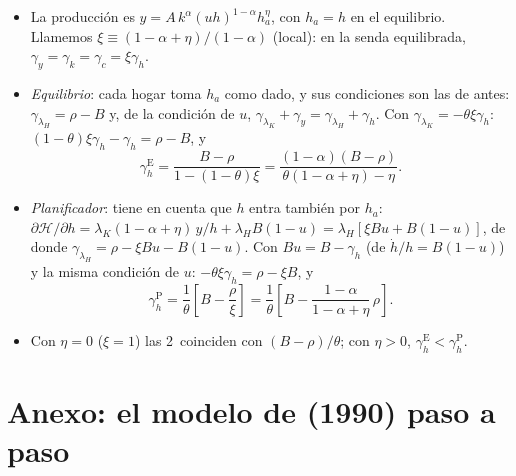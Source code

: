 \documentclass[11pt]{article}
\begin{document}
\begin{itemize}
\item La producción es $y=A\,k^{\alpha}(uh)^{1-\alpha}h_a^{\eta}$, con $h_a=h$ en el equilibrio. Llamemos $\xi\equiv(1-\alpha+\eta)/(1-\alpha)$ (local): en la senda equilibrada, $\gamma_y=\gamma_k=\gamma_c=\xi\gamma_h$.
\item \emph{Equilibrio}: cada hogar toma $h_a$ como dado, y sus condiciones son las de antes: $\gamma_{\lambda_H}=\rho-B$ y, de la condición de $u$, $\gamma_{\lambda_K}+\gamma_y=\gamma_{\lambda_H}+\gamma_h$. Con $\gamma_{\lambda_K}=-\theta\xi\gamma_h$: $(1-\theta)\xi\gamma_h-\gamma_h=\rho-B$, y
  \[\gamma_h^{\mathrm E}=\frac{B-\rho}{1-(1-\theta)\xi}=\frac{(1-\alpha)(B-\rho)}{\theta(1-\alpha+\eta)-\eta}.\]
\item \emph{Planificador}: tiene en cuenta que $h$ entra también por $h_a$: $\partial\mathcal H/\partial h=\lambda_K(1-\alpha+\eta)\,y/h+\lambda_HB(1-u)=\lambda_H[\xi Bu+B(1-u)]$, de donde $\gamma_{\lambda_H}=\rho-\xi Bu-B(1-u)$. Con $Bu=B-\gamma_h$ (de $\dot h/h=B(1-u)$) y la misma condición de $u$: $-\theta\xi\gamma_h=\rho-\xi B$, y
  \[\gamma_h^{\mathrm P}=\frac{1}{\theta}\left[B-\frac{\rho}{\xi}\right]=\frac{1}{\theta}\left[B-\frac{1-\alpha}{1-\alpha+\eta}\,\rho\right].\]
\item Con $\eta=0$ ($\xi=1$) las 2~coinciden con $(B-\rho)/\theta$; con $\eta>0$, $\gamma_h^{\mathrm E}<\gamma_h^{\mathrm P}$\nocite{Lucas1988}. \findemo
\end{itemize}

\section{Anexo: el modelo de  (1990) paso a paso}\label{anexo:romer}
\end{document}
